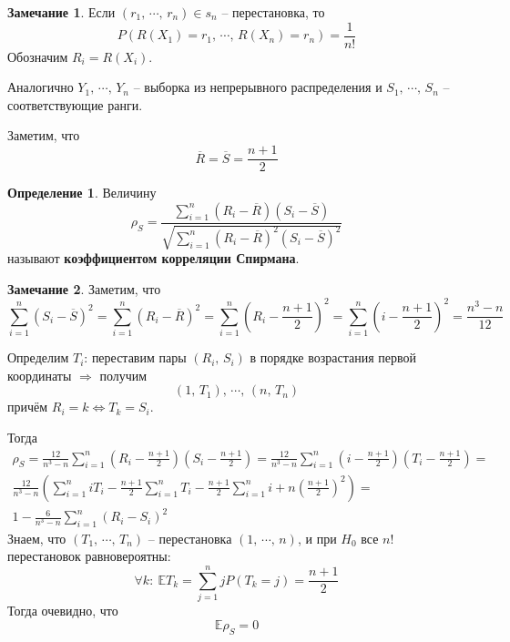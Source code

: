 \documentclass[a4paper,12pt]{article}
\theoremstyle{plain}
\theoremstyle{definition}
\newtheorem{definition}{Определение}[section]
\newtheorem*{note}{Замечание}
\theoremstyle{remark}
\begin{document}
\begin{note}
  Если $(r_1,\,\cdots,\,r_n) \in s_n$ -- перестановка, то
  \[
    P(R(X_1) = r_1,\,\cdots,\,R(X_n) = r_n) = \frac{1}{n!}
  \]
  Обозначим $R_i = R(X_i)$. 

  Аналогично $Y_1,\,\cdots,\,Y_n$ -- выборка из непрерывного распределения и $S_1,\,\cdots,\,S_n$ -- соответствующие ранги.

  Заметим, что
  \[
    \overline{R} = \overline{S} = \frac{n + 1}{2}
  \]
\end{note}

\begin{definition}
  Величину 
  \[
    \rho_S = \frac{\sum_{i = 1}^n(R_i - \overline{R})(S_i - \overline{S})}{\sqrt{\sum_{i = 1}^n(R_i - \overline{R})^2(S_i - \overline{S})^2}}
  \]
  называют \textbf{коэффициентом корреляции Спирмана}.
\end{definition}

\begin{note}
  Заметим, что
  \[
    \sum_{i = 1}^n(S_i - \overline{S})^2 = \sum_{i = 1}^n(R_i - \overline{R})^2 = \sum_{i = 1}^n\left(R_i - \frac{n + 1}{2}\right)^2 = \sum_{i = 1}^n\left(i - \frac{n + 1}{2}\right)^2 = \frac{n^3 - n}{12}
  \]
\end{note}

Определим $T_i$: переставим пары $(R_i,\,S_i)$ в порядке возрастания первой координаты $\Rightarrow$ получим
\[
  (1,\,T_1),\,\cdots,\,(n,\,T_n)
\]
причём $R_i = k \Leftrightarrow T_k = S_i$.

Тогда
\begin{align*}
  \rho_S = \frac{12}{n^3 - n}\sum_{i = 1}^n(R_i - \frac{n + 1}{2})(S_i - \frac{n + 1}{2}) = \frac{12}{n^3 - n}\sum_{i = 1}^n(i - \frac{n + 1}{2})(T_i - \frac{n + 1}{2}) =\\
  \frac{12}{n^3 - n}(\sum_{i = 1}^n iT_i - \frac{n + 1}{2}\sum_{i = 1}^nT_i - \frac{n + 1}{2}\sum_{i = 1}^ni + n(\frac{n + 1}{2})^2) =\\
  1 - \frac{6}{n^3 - n}\sum_{i = 1}^n(R_i - S_i)^2
\end{align*}
Знаем, что $(T_1,\,\cdots,\,T_n)$ -- перестановка $(1,\,\cdots,\,n)$, и при $H_0$ все $n!$ перестановок равновероятны:
\[
  \forall k :\: \mathbb{E}T_k = \sum_{j = 1}^n jP(T_k = j) = \frac{n + 1}{2}
\]
Тогда очевидно, что
\[
  \mathbb{E}\rho_S = 0
\]
\end{document}
